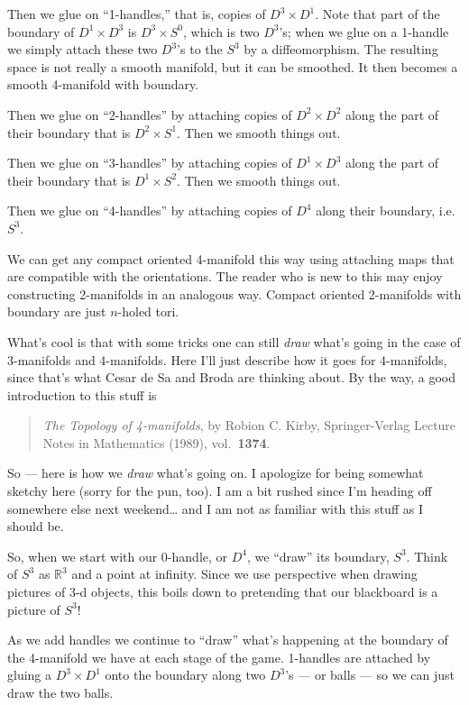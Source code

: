 \documentclass{article}
\begin{document}
Then we glue on ``1-handles,'' that is, copies of \(D^3 \times D^1\).
Note that part of the boundary of \(D^1 \times D^3\) is
\(D^3 \times S^0\), which is two \(D^3\)'s; when we glue on a 1-handle
we simply attach these two \(D^3\)'s to the \(S^3\) by a diffeomorphism.
The resulting space is not really a smooth manifold, but it can be
smoothed. It then becomes a smooth 4-manifold with boundary.

Then we glue on ``2-handles'' by attaching copies of \(D^2 \times D^2\)
along the part of their boundary that is \(D^2 \times S^1\). Then we
smooth things out.

Then we glue on ``3-handles'' by attaching copies of \(D^1 \times D^3\)
along the part of their boundary that is \(D^1 \times S^2\). Then we
smooth things out.

Then we glue on ``4-handles'' by attaching copies of \(D^4\) along their
boundary, i.e.~\(S^3\).

We can get any compact oriented 4-manifold this way using attaching maps
that are compatible with the orientations. The reader who is new to this
may enjoy constructing 2-manifolds in an analogous way. Compact oriented
2-manifolds with boundary are just \(n\)-holed tori.

What's cool is that with some tricks one can still \emph{draw} what's
going in the case of 3-manifolds and 4-manifolds. Here I'll just
describe how it goes for 4-manifolds, since that's what Cesar de Sa and
Broda are thinking about. By the way, a good introduction to this stuff
is

\begin{quote}
\emph{The Topology of 4-manifolds}, by Robion C. Kirby, Springer-Verlag
Lecture Notes in Mathematics (1989), vol.~\textbf{1374}.
\end{quote}

So --- here is how we \emph{draw} what's going on. I apologize for being
somewhat sketchy here (sorry for the pun, too). I am a bit rushed since
I'm heading off somewhere else next weekend\ldots{} and I am not as
familiar with this stuff as I should be.

So, when we start with our 0-handle, or \(D^4\), we ``draw'' its
boundary, \(S^3\). Think of \(S^3\) as \(\mathbb{R}^3\) and a point at
infinity. Since we use perspective when drawing pictures of 3-d objects,
this boils down to pretending that our blackboard is a picture of
\(S^3\)!

As we add handles we continue to ``draw'' what's happening at the
boundary of the 4-manifold we have at each stage of the game. 1-handles
are attached by gluing a \(D^3 \times D^1\) onto the boundary along two
\(D^3\)'s --- or balls --- so we can just draw the two balls.
\end{document}
